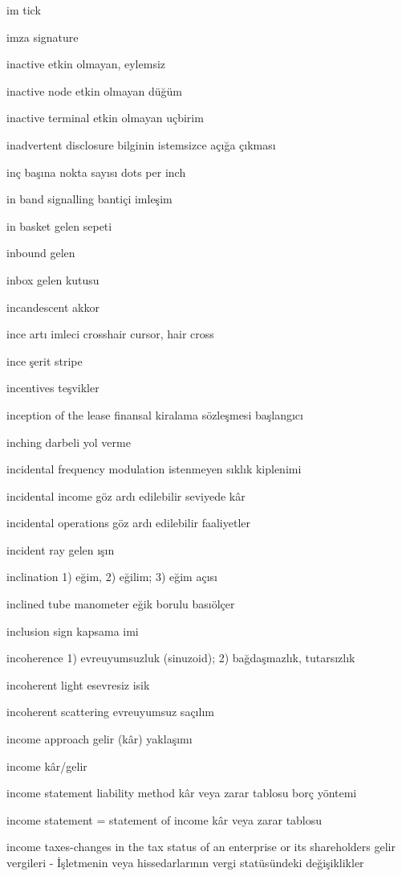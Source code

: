 \documentclass[12pt,fleqn]{article}\usepackage{../../common}
\begin{document}
im tick

imza signature

inactive etkin olmayan, eylemsiz

inactive node etkin olmayan düğüm

inactive terminal etkin olmayan uçbirim

inadvertent disclosure bilginin istemsizce açığa çıkması

inç başına nokta sayısı dots per inch

in band signalling bantiçi imleşim

in basket gelen sepeti

inbound gelen

inbox gelen kutusu

incandescent akkor

ince artı imleci crosshair cursor, hair cross

ince şerit stripe

incentives teşvikler

inception of the lease finansal kiralama sözleşmesi başlangıcı

inching darbeli yol verme

incidental frequency modulation istenmeyen sıklık kiplenimi

incidental income göz ardı edilebilir seviyede kâr

incidental operations göz ardı edilebilir faaliyetler

incident ray gelen ışın

inclination 1) eğim, 2) eğilim; 3) eğim açısı

inclined tube manometer eğik borulu basıölçer

inclusion sign kapsama imi

incoherence 1) evreuyumsuzluk (sinuzoid); 2) bağdaşmazlık, tutarsızlık

incoherent light esevresiz isik

incoherent scattering evreuyumsuz saçılım

income approach gelir (kâr) yaklaşımı

income kâr/gelir

income statement liability method kâr veya zarar tablosu borç yöntemi

income statement = statement of income kâr veya zarar tablosu

income taxes-changes in the tax status of an enterprise or its shareholders gelir vergileri - İşletmenin veya hissedarlarının vergi statüsündeki değişiklikler
\end{document}
